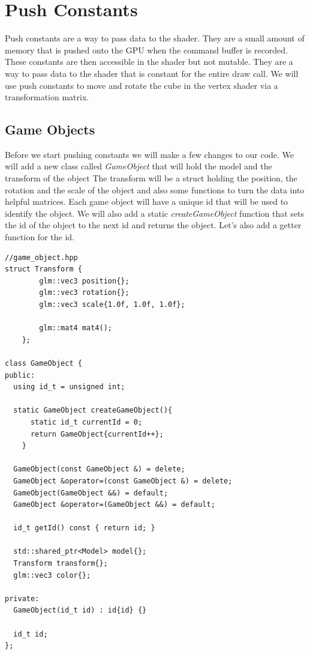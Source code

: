 \documentclass[12pt]{report} \usepackage{preamble}
\begin{document}
\section{Push Constants}

Push constants are a way to pass data to the shader. They are a small amount of memory that is pushed onto the \ac{GPU} when the command buffer is recorded.
These constants are then accessible in the shader but not mutable. They are a way to pass data to the shader that is constant for the entire draw call.
We will use push constants to move and rotate the cube in the vertex shader via a transformation matrix.

\subsection{Game Objects}

Before we start pushing constants we will make a few changes to our code. We will add a new class called \textit{GameObject} that will hold the model and the transform of the object
The transform will be a struct holding the position, the rotation and the scale of the object and also some functions to turn the data into helpful matrices.
Each game object will have a unique id that will be used to identify the object. We will also add a static \textit{createGameObject} function that
sets the id of the object to the next id and returns the object. Let's also add a getter function for the id.

\begin{lstlisting}[Language=C++]
//game_object.hpp
struct Transform {
		glm::vec3 position{};
		glm::vec3 rotation{};
		glm::vec3 scale{1.0f, 1.0f, 1.0f};

		glm::mat4 mat4();
	};

class GameObject {
public:
  using id_t = unsigned int;

  static GameObject createGameObject(){
      static id_t currentId = 0;
      return GameObject{currentId++};
    }

  GameObject(const GameObject &) = delete;
  GameObject &operator=(const GameObject &) = delete;
  GameObject(GameObject &&) = default;
  GameObject &operator=(GameObject &&) = default;

  id_t getId() const { return id; }

  std::shared_ptr<Model> model{};
  Transform transform{};
  glm::vec3 color{};

private:
  GameObject(id_t id) : id{id} {}

  id_t id;
};
\end{lstlisting}
\end{document}
